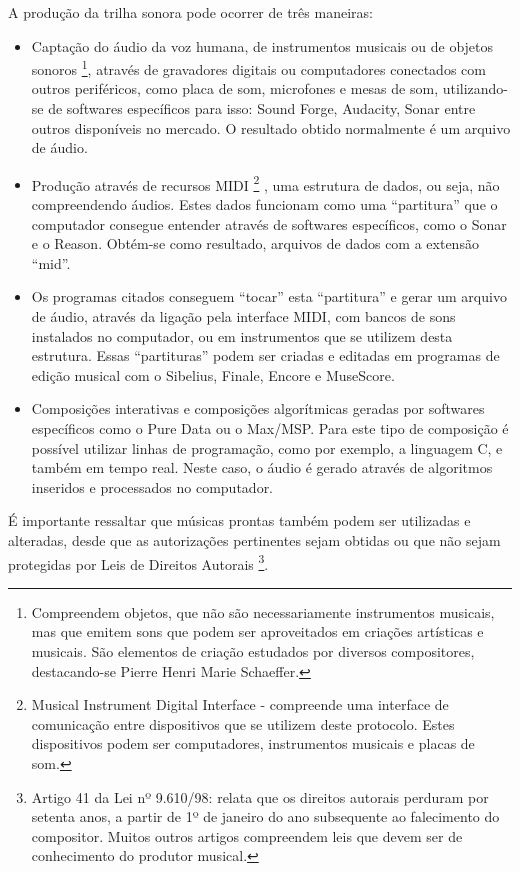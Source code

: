 A produção da trilha sonora pode ocorrer de três maneiras:
\begin{itemize}
\item Captação do áudio da voz humana, de instrumentos musicais ou de objetos sonoros
\footnote{Compreendem objetos, que não são necessariamente instrumentos musicais, mas que emitem sons que podem ser aproveitados em criações artísticas e musicais. São elementos de criação estudados por diversos compositores, destacando-se Pierre Henri Marie Schaeffer.}, 
através de gravadores digitais ou computadores conectados com outros periféricos, como placa de som, microfones e mesas de som, utilizando-se de softwares específicos para isso: Sound Forge, Audacity, Sonar entre outros disponíveis no mercado. O resultado obtido normalmente é um arquivo de áudio.
\item Produção através de recursos MIDI
\footnote{Musical Instrument Digital Interface - compreende uma interface de comunicação entre dispositivos que se utilizem deste protocolo. Estes dispositivos podem ser computadores, instrumentos musicais e placas de som.}
, uma estrutura de dados, ou seja, não compreendendo áudios. Estes dados funcionam como uma ``partitura'' que o computador consegue entender através de softwares específicos, como o Sonar e o Reason. Obtém-se como resultado, arquivos de dados com a extensão ``mid''.
\item Os programas citados conseguem ``tocar'' esta ``partitura'' e gerar um arquivo de áudio, através da ligação pela interface MIDI, com bancos de sons instalados no computador, ou em instrumentos que se utilizem desta estrutura. Essas ``partituras'' podem ser criadas e editadas em programas de edição musical com o Sibelius, Finale, Encore e MuseScore.
\item Composições interativas e composições algorítmicas geradas por softwares específicos como o Pure Data ou o Max/MSP. Para este tipo de composição é possível utilizar linhas de programação, como por exemplo, a linguagem C, e também em tempo real. Neste caso, o áudio é gerado através de algoritmos inseridos e processados no computador.
\end{itemize}

É importante ressaltar que músicas prontas também podem ser utilizadas e alteradas, desde que as autorizações pertinentes sejam obtidas ou que não sejam protegidas por Leis de Direitos Autorais
\footnote{Artigo 41 da Lei nº 9.610/98: relata que os direitos autorais perduram por setenta anos, a partir de 1º de janeiro do ano subsequente ao falecimento do compositor. Muitos outros artigos compreendem leis que devem ser de conhecimento do produtor musical.}. 

